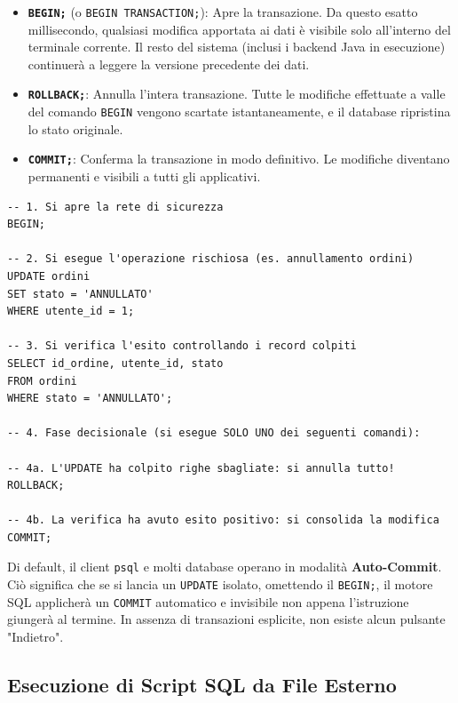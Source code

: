 \begin{itemize}
    \item \textbf{\texttt{BEGIN;}} (o \texttt{BEGIN TRANSACTION;}): Apre la transazione. Da questo esatto millisecondo, qualsiasi modifica apportata ai dati è visibile solo all'interno del terminale corrente. Il resto del sistema (inclusi i backend Java in esecuzione) continuerà a leggere la versione precedente dei dati.
    \item \textbf{\texttt{ROLLBACK;}}: Annulla l'intera transazione. Tutte le modifiche effettuate a valle del comando \texttt{BEGIN} vengono scartate istantaneamente, e il database ripristina lo stato originale.
    \item \textbf{\texttt{COMMIT;}}: Conferma la transazione in modo definitivo. Le modifiche diventano permanenti e visibili a tutti gli applicativi.
\end{itemize}

\begin{lstlisting}[language=PostgreSQL, title=Flusso Sicuro per la Manipolazione dei Dati]
-- 1. Si apre la rete di sicurezza
BEGIN;

-- 2. Si esegue l'operazione rischiosa (es. annullamento ordini)
UPDATE ordini
SET stato = 'ANNULLATO'
WHERE utente_id = 1;

-- 3. Si verifica l'esito controllando i record colpiti
SELECT id_ordine, utente_id, stato 
FROM ordini 
WHERE stato = 'ANNULLATO';

-- 4. Fase decisionale (si esegue SOLO UNO dei seguenti comandi):

-- 4a. L'UPDATE ha colpito righe sbagliate: si annulla tutto!
ROLLBACK;

-- 4b. La verifica ha avuto esito positivo: si consolida la modifica
COMMIT;
\end{lstlisting}

\begin{warningbox}
Di default, il client \texttt{psql} e molti database operano in modalità \textbf{Auto-Commit}. Ciò significa che se si lancia un \texttt{UPDATE} isolato, omettendo il \texttt{BEGIN;}, il motore SQL applicherà un \texttt{COMMIT} automatico e invisibile non appena l'istruzione giungerà al termine. In assenza di transazioni esplicite, non esiste alcun pulsante "Indietro".
\end{warningbox}

\subsection{Esecuzione di Script SQL da File Esterno}

